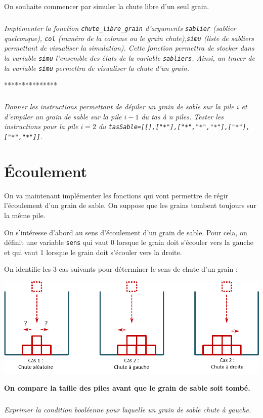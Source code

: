 \begin{obj}
On souhaite commencer par simuler la chute libre d'un seul grain.
\end{obj}


\subparagraph{}\textit{Implémenter la fonction \texttt{chute\_libre\_grain} d'arguments \texttt{sablier} (sablier quelconque), \texttt{col} (numéro de la colonne ou le grain chute),\texttt{simu} (liste de sabliers permettant de visualiser la simulation). Cette fonction permettra de stocker dans la variable \texttt{simu} l'ensemble des états de la variable \texttt{sabliers}. Ainsi, un tracer de la variable \texttt{simu} permettra de visualiser la chute d'un grain. }

***************


\subparagraph{}\textit{Donner les instructions permettant de dépiler un grain de sable sur la pile $i$ et d'empiler un grain de sable sur la pile $i-1$ du tas à n piles. Tester les instructions pour la pile $i=2$ du \texttt{tasSable=[[],["*"],["*","*","*"],["*"],["*","*"]]}.}
\section*{Écoulement}
On va maintenant implémenter les fonctions qui vont permettre de régir l'écoulement d'un grain de sable. On suppose que les grains tombent toujours sur la même pile. 

On s'intéresse d'abord au sens d'écoulement d'un grain de sable. Pour cela, on définit une variable \texttt{sens} qui vaut 0 lorsque le grain doit s'écouler vers la gauche et qui vaut 1 lorsque le grain doit s'écouler vers la droite.

On identifie les 3 cas suivants pour déterminer le sens de chute d'un grain :
\begin{center}
\includegraphics[width=\linewidth]{images/sablier_03}
\end{center}
\textbf{On compare la taille des piles avant que le grain de sable soit tombé.
}
\subparagraph{}
\textit{Exprimer la condition booléenne pour laquelle un grain de sable chute à gauche.}

